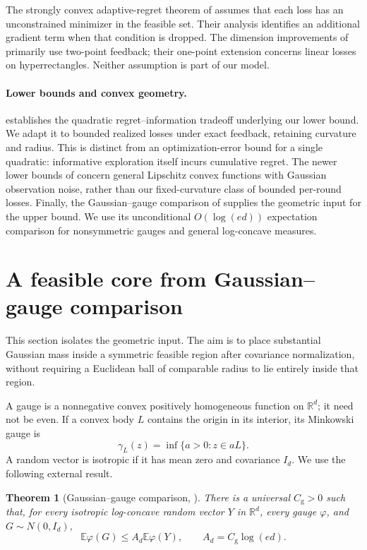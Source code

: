 \documentclass[11pt]{article}
\numberwithin{equation}{section}
\newcommand{\R}{\mathbb R}
\newcommand{\E}{\mathbb E}
\newtheorem{theorem}{Theorem}[section]
\theoremstyle{definition}
\theoremstyle{remark}
\begin{document}
The strongly convex adaptive-regret theorem of \citet[Theorem~1]{Liu25}
assumes that each loss has an unconstrained minimizer in the feasible set.
Their analysis identifies an additional gradient term when that condition is
dropped. The dimension improvements of \citet{Yu26} primarily use two-point
feedback; their one-point extension concerns linear losses on hyperrectangles.
Neither assumption is part of our model.

\paragraph{Lower bounds and convex geometry.}
\citet[Theorem~6]{Shamir13} establishes the quadratic regret--information
tradeoff underlying our lower bound. We adapt it to bounded realized losses
under exact feedback, retaining curvature and radius. This is distinct from
an optimization-error bound for a single quadratic: informative exploration
itself incurs cumulative regret. The newer lower bounds of \citet{RH26}
concern general Lipschitz convex functions with Gaussian observation noise,
rather than our fixed-curvature class of bounded per-round losses.
Finally, the Gaussian--gauge comparison of \citet{BK26} supplies the geometric
input for the upper bound. We use its unconditional $O(\log(ed))$ expectation
comparison for nonsymmetric gauges and general log-concave measures.

\section{A feasible core from Gaussian--gauge comparison}\label{sec:geometry}
This section isolates the geometric input. The aim is to place substantial
Gaussian mass inside a symmetric feasible region after covariance
normalization, without requiring a Euclidean ball of comparable radius to
lie entirely inside that region.

A gauge is a nonnegative convex positively homogeneous function on $\R^d$;
it need not be even. If a convex body $L$ contains the origin in its interior,
its Minkowski gauge is
\[
 \gamma_L(z)=\inf\{a>0:z\in aL\}.
\]
A random vector is isotropic if it has mean zero and covariance $I_d$.
We use the following external result.

\begin{theorem}[Gaussian--gauge comparison, \citealp{BK26}]\label{thm:gauge}
There is a universal $C_{\mathrm g}>0$ such that, for every isotropic
log-concave random vector $Y$ in $\R^d$, every gauge $\varphi$, and
$G\sim N(0,I_d)$,
\begin{equation}\label{eq:gaugecomparison}
 \E\varphi(G)\leq A_d\E\varphi(Y),
 \qquad A_d=C_{\mathrm g}\log(ed).
\end{equation}
\end{theorem}
\end{document}

